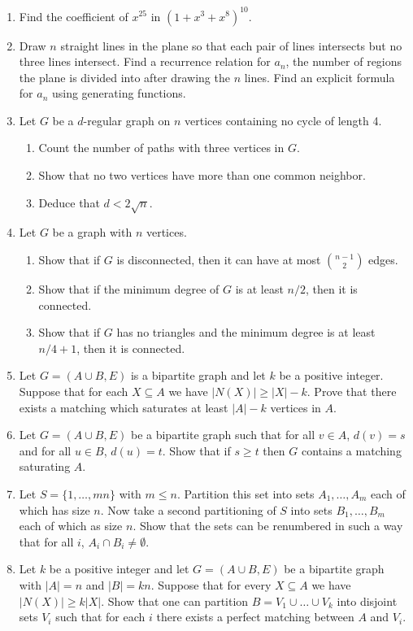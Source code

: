 \documentclass[11pt,letterpaper]{report}
\begin{document}
\begin{enumerate}
	\item Find the coefficient of $x^{25}$ in $(1+x^3+x^8)^{10}$.

	\item Draw $n$ straight lines in the plane so that each pair of lines intersects but no three lines intersect. Find a recurrence relation for $a_n$, the number of regions the plane is divided into after drawing the $n$ lines. Find an explicit formula for $a_n$ using generating functions.

	\item Let $G$ be a $d$-regular graph on $n$ vertices containing no cycle of length 4.
	\begin{enumerate}
		\item Count the number of paths with three vertices in $G$.
		\item Show that no two vertices have more than one common neighbor.
		\item Deduce that $d<2\sqrt{n}$.
	\end{enumerate}

	\item Let $G$ be a graph with $n$ vertices.
	\begin{enumerate}
		\item Show that if $G$ is disconnected, then it can have at most $\binom{n-1}{2}$ edges.
		\item Show that if the minimum degree of $G$ is at least $n/2$, then it is connected.
		\item Show that if $G$ has no triangles and the minimum degree is at least $n/4+1$, then it is connected.
	\end{enumerate}

	\item Let $G = (A\cup B, E)$ is a bipartite graph and let $k$ be a positive integer. Suppose that for each $X\subseteq A$ we have $|N(X)|\geq |X|-k$. Prove that there exists a matching which saturates at least $|A|-k$ vertices in $A$.

	\item Let $G = (A\cup B, E)$ be a bipartite graph such that for all $v\in A$, $d(v) = s$ and for all $u\in B$, $d(u) = t$. Show that if $s\geq t$ then $G$ contains a matching saturating $A$.

	\item Let $S = \{1, \ldots, mn\}$ with $m\leq n$. Partition this set into sets $A_1, \ldots, A_m$ each of which has size $n$. Now take a second partitioning of $S$ into sets $B_1, \ldots, B_m$ each of which as size $n$. Show that the sets can be renumbered in such a way that for all $i$, $A_i\cap B_i \neq \emptyset.$

	\item Let $k$ be a positive integer and let $G = (A\cup B, E)$ be a bipartite graph with $|A| = n$ and $|B| = kn$. Suppose that for every $X\subseteq A$ we have $|N(X)|\geq k|X|$. Show that one can partition $B = V_1\cup \ldots \cup V_k$ into disjoint sets $V_i$ such that for each $i$ there exists a perfect matching between $A$ and $V_i$.	
\end{enumerate}
\end{document}
